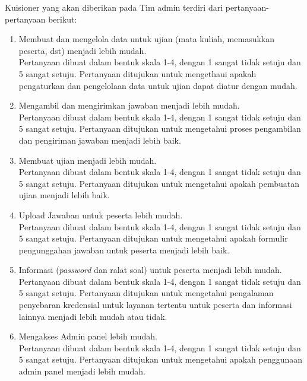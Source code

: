     Kuisioner yang akan diberikan pada Tim admin terdiri dari pertanyaan-pertanyaan berikut:
    \begin{enumerate}
        \item Membuat dan mengelola data untuk ujian (mata kuliah, memasukkan peserta, dst) menjadi lebih mudah. \\
            Pertanyaan dibuat dalam bentuk skala 1-4, dengan 1 sangat tidak setuju dan 5 sangat setuju.
            Pertanyaan ditujukan untuk mengethaui apakah pengaturkan dan pengelolaan data untuk ujian dapat
            diatur dengan mudah.

        \item Mengambil dan mengirimkan jawaban menjadi lebih mudah. \\
            Pertanyaan dibuat dalam bentuk skala 1-4, dengan 1 sangat tidak setuju dan 5 sangat setuju.
            Pertanyaan ditujukan untuk mengetahui proses pengambilan dan pengiriman jawaban menjadi lebih
            baik.
        
        \item Membuat ujian menjadi lebih mudah. \\
            Pertanyaan dibuat dalam bentuk skala 1-4, dengan 1 sangat tidak setuju dan 5 sangat setuju.
            Pertanyaan ditujukan untuk mengetahui apakah pembuatan ujian menjadi lebih baik.
        
        \item Upload Jawaban untuk peserta lebih mudah. \\
            Pertanyaan dibuat dalam bentuk skala 1-4, dengan 1 sangat tidak setuju dan 5 sangat setuju.
            Pertanyaan ditujukan untuk mengetahui apakah formulir pengunggahan jawaban untuk peserta
            menjadi lebih baik.
            
        \item Informasi (\textit{password} dan ralat soal) untuk peserta menjadi lebih mudah. \\
            Pertanyaan dibuat dalam bentuk skala 1-4, dengan 1 sangat tidak setuju dan 5 sangat setuju.
            Pertanyaan ditujukan untuk mengetahui pengalaman penyebaran kredensial untuk layanan tertentu
            untuk peserta dan informasi lainnya menjadi lebih mudah atau tidak.
            
        \item Mengakses Admin panel lebih mudah. \\
            Pertanyaan dibuat dalam bentuk skala 1-4, dengan 1 sangat tidak setuju dan 5 sangat setuju.
            Pertanyaan ditujukan untuk mengetahui apakah penggunaan admin panel menjadi lebih mudah.
        

\end{enumerate}
